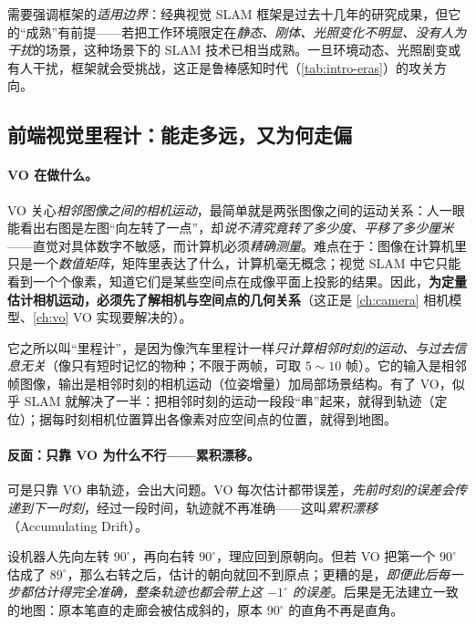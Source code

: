 \noindent 需要强调框架的\emph{适用边界}：经典视觉 SLAM 框架是过去十几年的研究成果，但它的“成熟”有前提——若把工作环境限定在\emph{静态、刚体、光照变化不明显、没有人为干扰}的场景，这种场景下的 SLAM 技术已相当成熟\cite{gaoxiang2019slam14}。一旦环境动态、光照剧变或有人干扰，框架就会受挑战，这正是鲁棒感知时代（\cref{tab:intro-eras}）的攻关方向。

\subsection{前端视觉里程计：能走多远，又为何走偏}
\label{sec:intro-vo}
\paragraph{VO 在做什么。}
VO 关心\emph{相邻图像之间的相机运动}，最简单就是两张图像之间的运动关系：人一眼能看出右图是左图“向左转了一点”，却\emph{说不清究竟转了多少度、平移了多少厘米}——直觉对具体数字不敏感，而计算机必须\emph{精确测量}\cite{gaoxiang2019slam14}。难点在于：图像在计算机里只是一个\emph{数值矩阵}，矩阵里表达了什么，计算机毫无概念；视觉 SLAM 中它只能看到一个个像素，知道它们是某些空间点在成像平面上投影的结果。因此，\textbf{为定量估计相机运动，必须先了解相机与空间点的几何关系}（这正是 \cref{ch:camera} 相机模型、\cref{ch:vo} VO 实现要解决的）。

它之所以叫“里程计”，是因为像汽车里程计一样\emph{只计算相邻时刻的运动、与过去信息无关}（像只有短时记忆的物种；不限于两帧，可取 $5\!\sim\!10$ 帧）。它的输入是相邻帧图像，输出是相邻时刻的相机运动（位姿增量）加局部场景结构。有了 VO，似乎 SLAM 就解决了一半：把相邻时刻的运动一段段“串”起来，就得到轨迹（定位）；据每时刻相机位置算出各像素对应空间点的位置，就得到地图。

\paragraph{反面：只靠 VO 为什么不行——累积漂移。}
可是只靠 VO 串轨迹，会出大问题。VO 每次估计都带误差，\emph{先前时刻的误差会传递到下一时刻}，经过一段时间，轨迹就不再准确——这叫\emph{累积漂移}（Accumulating Drift）\cite{gaoxiang2019slam14}。

\begin{example}[累积漂移的一度之差]\label{ex:intro-drift}
设机器人先向左转 $90^\circ$，再向右转 $90^\circ$，理应回到原朝向。但若 VO 把第一个 $90^\circ$ 估成了 $89^\circ$，那么右转之后，估计的朝向就回不到原点；更糟的是，\emph{即便此后每一步都估计得完全准确，整条轨迹也都会带上这 $-1^\circ$ 的误差}。后果是无法建立一致的地图：原本笔直的走廊会被估成斜的，原本 $90^\circ$ 的直角不再是直角。
\end{example}

